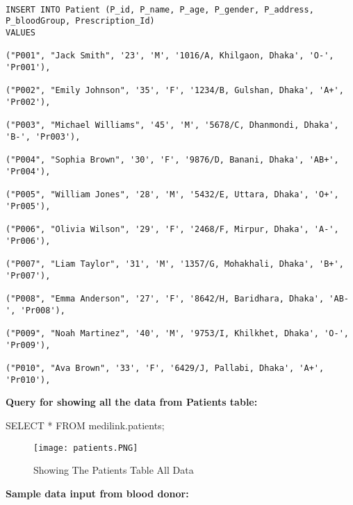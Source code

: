 \documentclass[11pt]{article}
\begin{document}
\begin{lstlisting}

INSERT INTO Patient (P_id, P_name, P_age, P_gender, P_address, P_bloodGroup, Prescription_Id) 
VALUES

("P001", "Jack Smith", '23', 'M', '1016/A, Khilgaon, Dhaka', 'O-', 'Pr001'),

("P002", "Emily Johnson", '35', 'F', '1234/B, Gulshan, Dhaka', 'A+', 'Pr002'),

("P003", "Michael Williams", '45', 'M', '5678/C, Dhanmondi, Dhaka', 'B-', 'Pr003'),

("P004", "Sophia Brown", '30', 'F', '9876/D, Banani, Dhaka', 'AB+', 'Pr004'),

("P005", "William Jones", '28', 'M', '5432/E, Uttara, Dhaka', 'O+', 'Pr005'),

("P006", "Olivia Wilson", '29', 'F', '2468/F, Mirpur, Dhaka', 'A-', 'Pr006'),

("P007", "Liam Taylor", '31', 'M', '1357/G, Mohakhali, Dhaka', 'B+', 'Pr007'),

("P008", "Emma Anderson", '27', 'F', '8642/H, Baridhara, Dhaka', 'AB-', 'Pr008'),

("P009", "Noah Martinez", '40', 'M', '9753/I, Khilkhet, Dhaka', 'O-', 'Pr009'),

("P010", "Ava Brown", '33', 'F', '6429/J, Pallabi, Dhaka', 'A+', 'Pr010'),

\end{lstlisting}

\textbf{Query for showing all the data from Patients table: }

SELECT * FROM medilink.patients;
\begin{figure}[H]
    \centering
    \texttt{[image: patients.PNG]}
    \caption{Showing The Patients Table All Data}
    \label{fig:1}
\end{figure}



\textbf{Sample data input from blood donor:}
\end{document}
